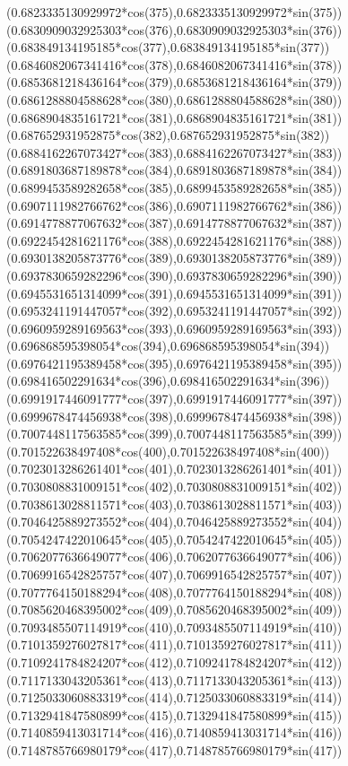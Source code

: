 {({0.6823335130929972*cos(375)},{0.6823335130929972*sin(375)})
({0.6830909032925303*cos(376)},{0.6830909032925303*sin(376)})
({0.683849134195185*cos(377)},{0.683849134195185*sin(377)})
({0.6846082067341416*cos(378)},{0.6846082067341416*sin(378)})
({0.6853681218436164*cos(379)},{0.6853681218436164*sin(379)})
({0.6861288804588628*cos(380)},{0.6861288804588628*sin(380)})
({0.6868904835161721*cos(381)},{0.6868904835161721*sin(381)})
({0.687652931952875*cos(382)},{0.687652931952875*sin(382)})
({0.6884162267073427*cos(383)},{0.6884162267073427*sin(383)})
({0.6891803687189878*cos(384)},{0.6891803687189878*sin(384)})
({0.6899453589282658*cos(385)},{0.6899453589282658*sin(385)})
({0.6907111982766762*cos(386)},{0.6907111982766762*sin(386)})
({0.6914778877067632*cos(387)},{0.6914778877067632*sin(387)})
({0.6922454281621176*cos(388)},{0.6922454281621176*sin(388)})
({0.6930138205873776*cos(389)},{0.6930138205873776*sin(389)})
({0.6937830659282296*cos(390)},{0.6937830659282296*sin(390)})
({0.6945531651314099*cos(391)},{0.6945531651314099*sin(391)})
({0.6953241191447057*cos(392)},{0.6953241191447057*sin(392)})
({0.6960959289169563*cos(393)},{0.6960959289169563*sin(393)})
({0.696868595398054*cos(394)},{0.696868595398054*sin(394)})
({0.6976421195389458*cos(395)},{0.6976421195389458*sin(395)})
({0.698416502291634*cos(396)},{0.698416502291634*sin(396)})
({0.6991917446091777*cos(397)},{0.6991917446091777*sin(397)})
({0.6999678474456938*cos(398)},{0.6999678474456938*sin(398)})
({0.7007448117563585*cos(399)},{0.7007448117563585*sin(399)})
({0.701522638497408*cos(400)},{0.701522638497408*sin(400)})
({0.7023013286261401*cos(401)},{0.7023013286261401*sin(401)})
({0.7030808831009151*cos(402)},{0.7030808831009151*sin(402)})
({0.7038613028811571*cos(403)},{0.7038613028811571*sin(403)})
({0.7046425889273552*cos(404)},{0.7046425889273552*sin(404)})
({0.7054247422010645*cos(405)},{0.7054247422010645*sin(405)})
({0.7062077636649077*cos(406)},{0.7062077636649077*sin(406)})
({0.7069916542825757*cos(407)},{0.7069916542825757*sin(407)})
({0.7077764150188294*cos(408)},{0.7077764150188294*sin(408)})
({0.7085620468395002*cos(409)},{0.7085620468395002*sin(409)})
({0.7093485507114919*cos(410)},{0.7093485507114919*sin(410)})
({0.7101359276027817*cos(411)},{0.7101359276027817*sin(411)})
({0.7109241784824207*cos(412)},{0.7109241784824207*sin(412)})
({0.7117133043205361*cos(413)},{0.7117133043205361*sin(413)})
({0.7125033060883319*cos(414)},{0.7125033060883319*sin(414)})
({0.7132941847580899*cos(415)},{0.7132941847580899*sin(415)})
({0.7140859413031714*cos(416)},{0.7140859413031714*sin(416)})
({0.7148785766980179*cos(417)},{0.7148785766980179*sin(417)})
}
